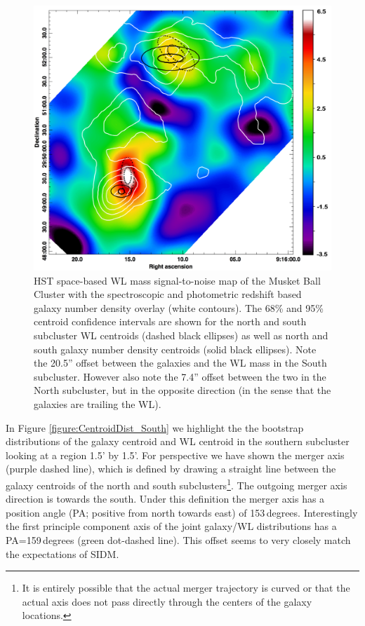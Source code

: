 \begin{figure}
\centering
\includegraphics[width=5in]{Chapter4/LensingGalaxyOverlay.png}
\caption[Musket Ball Cluster weak lensing signal-to-noise map with galaxy number density map overlay, including centroid locations.]{
HST space-based WL mass signal-to-noise map of the Musket Ball Cluster with the spectroscopic and photometric redshift based galaxy number density overlay (white contours).
The 68\% and 95\% centroid confidence intervals are shown for the north and south subcluster WL centroids (dashed black ellipses) as well as north and south galaxy number density centroids (solid black ellipses).
Note the 20.5'' offset between the galaxies and the WL mass in the South subcluster.
However also note the 7.4'' offset between the two in the North subcluster, but in the opposite direction (in the sense that the galaxies are trailing the WL).
}
\label{figure:LensingGalaxyOverlay}
\end{figure}

In Figure \ref{figure:CentroidDist_South} we highlight the the bootstrap distributions of the galaxy centroid and WL centroid in the southern subcluster looking at a region 1.5' by 1.5'.
For perspective we have shown the merger axis (purple dashed line), which is defined by drawing a straight line between the galaxy centroids of the north and south subclusters\footnote{It is entirely possible that the actual merger trajectory is curved or that the actual axis does not pass directly through the centers of the galaxy locations.}.
The outgoing merger axis direction is towards the south.
Under this definition the merger axis has a position angle (PA; positive from north towards east) of 153\,degrees.
Interestingly the first principle component axis of the joint galaxy/WL distributions has a PA=159\,degrees (green dot-dashed line).
This offset seems to very closely match the expectations of SIDM.

